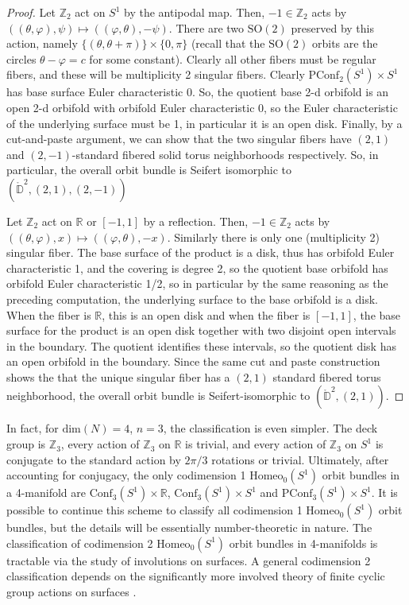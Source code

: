 \documentclass[10pt, oneside]{article}
\newcommand{\R}{\mathbb{R}}
\newcommand{\Z}{\mathbb{Z}}
\newcommand{\SO}[1][2]{\text{SO}(#1)}
\newcommand{\homeo}[1][S^1]{\text{Homeo}_0(#1)}
\newcommand{\conf}[2][S^1]{\text{Conf}_{#2}(#1)}
\newcommand{\pconf}[2][S^1]{\text{PConf}_{#2}(#1)}
\theoremstyle{definition}
\theoremstyle{definition}
\begin{document}
\begin{proof}
    Let $\Z_2$ act on $S^1$ by the antipodal map. Then, $-1\in\Z_2$\improve{introduce using $\Z_2 =\{-1, 1\}$} acts by $((\theta, \varphi), \psi)\mapsto ((\varphi, \theta), -\psi)$. There are two $\SO$ preserved by this action, namely $\{(\theta, \theta + \pi)\}\times \{0, \pi\}$ (recall that the $\SO$ orbits are the circles $\theta-\varphi = c$ for some constant). Clearly all other fibers must be regular fibers, and these will be multiplicity 2 singular fibers. Clearly $\pconf{2}\times S^1$ has base surface Euler characteristic 0. So, the quotient base 2-d orbifold is an open 2-d orbifold with orbifold Euler characteristic 0, so the Euler characteristic of the underlying surface must be 1, in particular it is an open disk. Finally, by a cut-and-paste argument, we can show that the two singular fibers have $(2, 1)$ and $(2,-1)$-standard fibered solid torus neighborhoods respectively. So, in particular, the overall orbit bundle is Seifert isomorphic to $(\mathring{\mathbb{D}}^2, (2, 1), (2,-1))$

    Let $\Z_2$ act on $\R$ or $[-1, 1]$ by a reflection. Then, $-1\in\Z_2$ acts by $((\theta, \varphi), x)\mapsto ((\varphi, \theta), -x)$. Similarly there is only one (multiplicity 2) singular fiber. The base surface of the product is a disk, thus has orbifold Euler characteristic 1, and the covering is degree 2, so the quotient base orbifold has orbifold Euler characteristic 1/2, so in particular by the same reasoning as the preceding computation, the underlying surface to the base orbifold is a disk. When the fiber is $\R$, this is an open disk and when the fiber is $[-1,1]$, the base surface for the product is an open disk together with two disjoint open intervals in the boundary. The quotient identifies these intervals, so the quotient disk has an open orbifold in the boundary. Since the same cut and paste construction shows the that the unique singular fiber has a $(2,1)$ standard fibered torus neighborhood, the overall orbit bundle is Seifert-isomorphic to $(\mathring{\mathbb{D}}^2, (2, 1))$.
\end{proof}

 In fact, for $\text{dim}(N) = 4$, $n=3$, the classification is even simpler. The deck group is $\Z_3$, every action of $\Z_3$ on $\R$ is trivial, and every action of $\Z_3$ on $S^1$ is conjugate to the standard action by $2\pi/3$ rotations or trivial. Ultimately, after accounting for conjugacy, the only codimension 1 $\homeo$ orbit bundles in a 4-manifold are $\conf[S^1]{3}\times \R$, $\conf[S^1]{3}\times S^1$ and $\pconf[S^1]{3}\times S^1$. It is possible to continue this scheme to classify all codimension 1 $\homeo$ orbit bundles, but the details will be essentially number-theoretic in nature. The classification of codimension 2 $\homeo$ orbit bundles in 4-manifolds is tractable via the study of involutions on surfaces\cite{dugger_involutions_2019}. A general codimension 2 classification depends on the significantly more involved theory of finite cyclic group actions on surfaces \cite{harvey_cyclic_1966}\cite{ding_classification_1997}.
\end{document}
